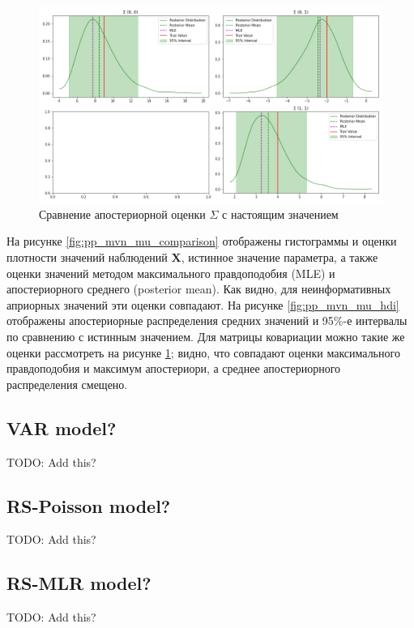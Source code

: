 \documentclass[a4paper,14pt]{extreport}
\begin{document}
\begin{figure}[h!]
	\includegraphics[width=\linewidth]{img/gen/pp_mvn_sigma_hdi.png}
	\caption{Сравнение апостериорной оценки $\Sigma$ с настоящим значением}
	\label{fig:pp_mvn_sigma_hdi}
\end{figure}

На рисунке \ref{fig:pp_mvn_mu_comparison} отображены гистограммы и оценки плотности значений наблюдений $\mathbf{X}$, истинное значение параметра, а также оценки значений методом максимального правдоподобия (MLE) и апостериорного среднего (posterior mean). Как видно, для неинформативных априорных значений эти оценки совпадают. На рисунке \ref{fig:pp_mvn_mu_hdi} отображены апостериорные распределения средних значений и 95\%-е интервалы по сравнению с истинным значением. Для матрицы ковариации можно такие же оценки рассмотреть на рисунке \ref{fig:pp_mvn_sigma_hdi}; видно, что совпадают оценки максимального правдоподобия и максимум апостериори, а среднее апостериорного распределения смещено.


\subsection{VAR model?}

TODO: Add this?


\subsection{RS-Poisson model?}

TODO: Add this?


\subsection{RS-MLR model?}

TODO: Add this?
\end{document}
